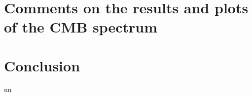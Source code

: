 \documentclass{article}
\begin{document}

\section{Comments on the results and plots of the CMB spectrum}







\section{Conclusion}
nn
\citep{padmanabhanDetectingDarkMatter2005}





\end{document}

